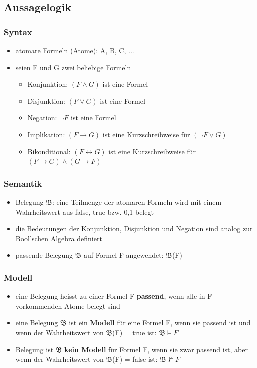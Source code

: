 \documentclass[a4paper,10pt]{article}
\newcommand{\Bold}[1]{\textbf{#1}} %
\newcommand{\ra}{\rightarrow}
\begin{document}
\subsection{Aussagelogik}
\subsubsection{Syntax}
		\begin{itemize}
			\item atomare Formeln (Atome): A, B, C, ...
			\item seien F und G zwei beliebige Formeln
				\begin{itemize}
					\item Konjunktion: $(F \wedge G)$ ist eine Formel
					\item Disjunktion: $(F \vee G)$ ist eine Formel
					\item Negation: $\neg F$ ist eine Formel
					\item Implikation: $(F \rightarrow G)$ ist eine Kurzschreibweise f\"ur $(\neg F \vee G)$
					\item Bikonditional: $(F \leftrightarrow G)$ ist eine Kurzschreibweise f\"ur $(F \ra G) \wedge (G \ra F)$
				\end{itemize}
		\end{itemize}
		
\subsubsection{Semantik}
		\begin{itemize}
				\item Belegung $\mathfrak{B}$: eine Teilmenge der atomaren Formeln wird mit einem Wahrheitswert aus {false, true} bzw. {0,1} belegt
				\item die Bedeutungen der Konjunktion, Disjunktion und Negation sind analog zur Bool'schen Algebra definiert
				\item passende Belegung $\mathfrak{B}$ auf Formel F angewendet: $\mathfrak{B}$(F)
		\end{itemize}
		
\subsubsection{Modell}
		\begin{itemize}
			\item eine Belegung heisst zu einer Formel F \Bold {passend}, wenn alle in F
vorkommenden Atome belegt sind
			\item eine Belegung $\mathfrak{B}$ ist ein \Bold {Modell} f\"ur eine Formel F, wenn sie passend ist
und wenn der Wahrheitswert von $\mathfrak{B}$(F) = true ist: $\mathfrak{B} \models F$
			\item Belegung ist $\mathfrak{B}$ \Bold {kein Modell} f\"ur Formel F, wenn sie zwar passend ist,
aber wenn der Wahrheitswert von $\mathfrak{B}$(F) = false ist: $\mathfrak{B} \nvDash F$
		\end{itemize}
		
\end{document}

